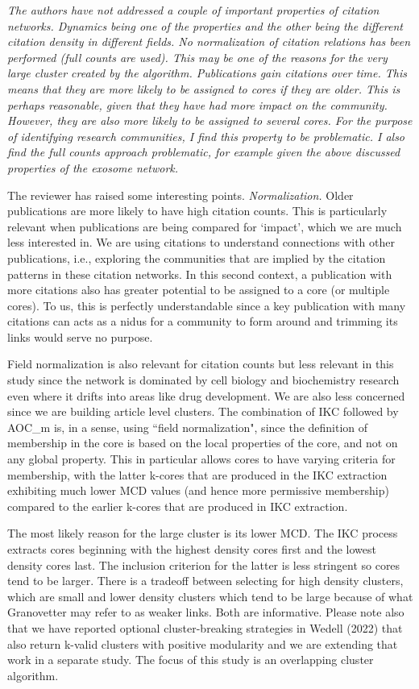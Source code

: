 \documentclass[11pt, oneside]{article}   	%
\begin{document}
\emph{The authors have not addressed a couple of important properties of citation networks. Dynamics being one of the properties and the other being the different citation density in different fields. No normalization of citation relations has been performed (full counts are used). This may be one of the reasons for the very large cluster created by the algorithm. Publications gain citations over time. This means that they are more likely to be assigned to cores if they are older. This is perhaps reasonable, given that they have had more impact on the community. However, they are also more likely to be assigned to several cores. For the purpose of identifying research communities, I find this property to be problematic. I also find the full counts approach problematic, for example given the above discussed properties of the exosome network.}

The reviewer has raised some interesting points. \emph{Normalization.} Older publications are more likely to have high citation counts. This is particularly relevant when publications are being compared for `impact', which we are much less interested in. We are using citations to understand connections with other publications, i.e., exploring the communities that are implied by the citation patterns in these citation networks. In this second context, a publication with more citations also has greater potential to be assigned to a core (or multiple cores). To us, this is perfectly understandable since a key publication with many citations can acts as a nidus for a community to form around and trimming its links would serve no purpose.  

Field normalization is also relevant for citation counts but less relevant in this study since the network is dominated by cell biology and biochemistry research even where it drifts into areas like drug development. We are also less concerned since we are building article level clusters. The combination of IKC followed by AOC\_m is, in a sense, using ``field normalization", since the definition of membership in the core is based on the local properties of the core, and not on any global property. This in particular allows cores to have varying criteria for membership, with the latter k-cores that are produced in the IKC extraction exhibiting much lower MCD values (and hence more permissive membership) compared to the earlier k-cores that are produced in IKC extraction. 

The most likely reason for the large cluster is its lower MCD. The IKC process extracts cores beginning with the highest density cores first and the lowest density cores last. The inclusion criterion for the latter is less stringent so cores tend to be larger. There is a tradeoff between selecting for high density clusters, which are small and lower density clusters which tend to be large because of what Granovetter may refer to as weaker links. Both are informative. Please note also that we have reported optional cluster-breaking strategies in Wedell (2022) that also return k-valid clusters with positive modularity and we are extending that work in a separate study. The focus of this study is an overlapping cluster algorithm.
\end{document}
